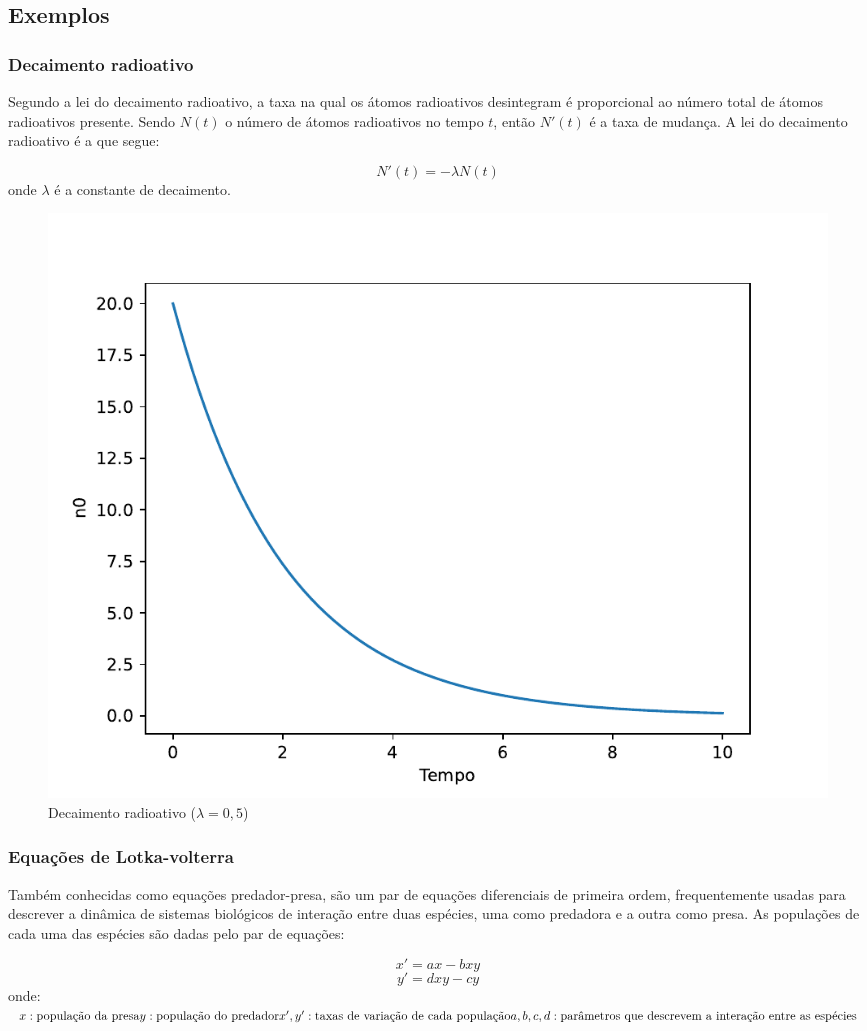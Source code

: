 \subsection{Exemplos}
\subsubsection{Decaimento radioativo}
Segundo a lei do decaimento radioativo, a taxa na qual os átomos radioativos desintegram é proporcional ao número total de átomos radioativos presente. Sendo $N(t)$ o número de átomos radioativos no tempo $t$, então $N'(t)$ é a taxa de mudança. A lei do decaimento radioativo é a que segue:

$$N'(t) = -\lambda N(t)$$
onde $\lambda$ é a constante de decaimento.

\begin{figure}[htb!]
	\centering
	\caption{Decaimento radioativo ($\lambda = 0,5$)}
	\label{fig:decaimento}
	\includegraphics[width=0.7\linewidth]{figs/decaimento}
\end{figure}

\subsubsection{Equações de Lotka-volterra}
Também conhecidas como equações predador-presa, são um par de equações diferenciais de primeira ordem, frequentemente usadas para descrever a dinâmica de sistemas biológicos de interação entre duas espécies, uma como predadora e a outra como presa. As populações de cada uma das espécies são dadas pelo par de equações:

$$
x' = ax - bxy
$$$$
y' = dxy - cy
$$
onde:\\
$
x: \text{população da presa}\\
y: \text{população do predador}\\
x', y': \text{taxas de variação de cada população}\\
a, b, c, d: \text{parâmetros que descrevem a interação entre as espécies}
$

